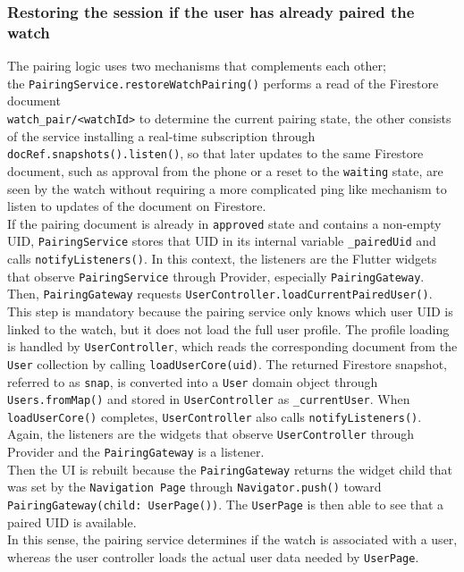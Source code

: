 \subsubsection{Restoring the session if the user has already paired the watch}
The pairing logic uses two mechanisms that complements each other; \\the \texttt{PairingService.restoreWatchPairing()} performs a read of the Firestore document \\ \texttt{watch\_pair/<watchId>} to determine the current pairing state, the other consists of the service installing a real-time subscription through \texttt{docRef.snapshots().listen()}, so that later updates to the same Firestore document, such as approval from the phone or a reset to the \texttt{waiting} state, are seen by the watch without requiring a more complicated ping like mechanism to listen to updates of the document on Firestore. \\
If the pairing document is already in \texttt{approved} state and contains a non-empty UID, \texttt{PairingService} stores that UID in its internal variable \texttt{\_pairedUid} and calls \texttt{notifyListeners()}. In this context, the listeners are the Flutter widgets that observe \texttt{PairingService} through Provider, especially  \texttt{PairingGateway}. \\
Then, \texttt{PairingGateway} requests \texttt{UserController.loadCurrentPairedUser()}. This step is mandatory because the pairing service only knows which user UID is linked to the watch, but it does not load the full user profile. The profile loading is handled by \texttt{UserController}, which reads the corresponding document from the \texttt{User} collection by calling \texttt{loadUserCore(uid)}. The returned Firestore snapshot, referred to as \texttt{snap}, is converted into a \texttt{User} domain object through \texttt{Users.fromMap()} and stored in \texttt{UserController} as \texttt{\_currentUser}. When \texttt{loadUserCore()} completes, \texttt{UserController} also calls \texttt{notifyListeners()}. \\
Again, the listeners are the widgets that observe \texttt{UserController} through Provider and the \texttt{PairingGateway} is a listener. \\
Then the UI is rebuilt because the \texttt{PairingGateway} returns the widget child that was set by the \texttt{Navigation Page} through \texttt{Navigator.push()} toward \texttt{PairingGateway(child: UserPage())}. The \texttt{UserPage} is then able to see that a paired UID is available. \\
In this sense, the pairing service determines if the watch is associated with a user, whereas the user controller loads the actual user data needed by \texttt{UserPage}. \\

